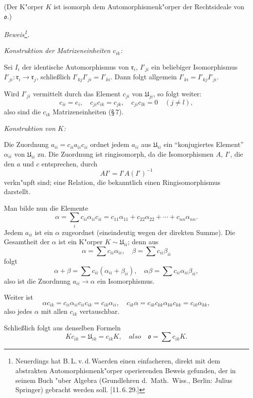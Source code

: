 \documentclass[12pt,a4paper]{article}
\theoremstyle{plain}
\begin{document}
(Der K"orper $K$ ist isomorph dem Automorphismenk"orper der Rechtsideale von $\mathfrak{o}$.)

\noindent\textit{Beweis\footnote{Neuerdings hat B.\,L.\,v.\,d.\,Waerden einen einfacheren, direkt mit dem abstrakten Automorphismenk"orper operierenden Beweis gefunden, der in seinem Buch "uber Algebra (Grundlehren d.\ Math.\ Wiss., Berlin: Julius Springer) gebracht werden soll. [11.\,6.\,29.]}.}

\textit{Konstruktion der Matrizeneinheiten $c_{ik}$:}

Sei $I_i$ der identische Automorphismus von $\mathfrak{r}_i$, $I'_{ji}$ ein beliebiger Isomorphismus $I'_{ji}:\mathfrak{r}_i \to \mathfrak{r}_j$, schlie\ss lich $I'_{kj}I'_{ji} = I'_{ki}$. Dann folgt allgemein $I'_{ki} = I'_{kj}I'_{ji}$.

Wird $I'_{ji}$ vermittelt durch das Element $c_{ji}$ von $\mathfrak{U}_{ji}$, so folgt weiter:
\[
c_{ii} = e_i,\quad c_{ji}c_{ik} = c_{jk},\quad c_{ji}c_{lk} = 0\quad (j \neq l),
\]
also sind die $c_{ik}$ Matrizeneinheiten (\S\,7).

\medskip
\textit{Konstruktion von $K$:}

Die Zuordnung $a_{ii} = c_{ii}a_{ii}c_{ii}$ ordnet jedem $a_{ii}$ aus $\mathfrak{U}_{ii}$ ein ``konjugiertes Element'' $\alpha_{ii}$ von $\mathfrak{U}_{ii}$ zu.
Die Zuordnung ist ringisomorph, da die Isomorphismen $A$, $I'$, die den $a$ und $c$ entsprechen, durch
\[
AI' = I'A(I')^{-1}
\]
verkn"upft sind; eine Relation, die bekanntlich einen Ringisomorphismus darstellt.

Man bilde nun die Elemente
\[
\alpha = \sum_i c_{ii}\alpha_{ii}c_{ii}
= c_{11}\alpha_{11} + c_{22}\alpha_{22} + \cdots + c_{nn}\alpha_{nn}.
\]
Jedem $a_{ii}$ ist ein $\alpha$ zugeordnet (eineindeutig wegen der direkten Summe). Die Gesamtheit der $\alpha$ ist ein K"orper $K \sim \mathfrak{U}_{ii}$; denn aus
\[
\alpha = \sum c_{ii}\alpha_{ii},\quad
\beta = \sum c_{ii}\beta_{ii}
\]
folgt
\[
\alpha + \beta = \sum c_{ii}(\alpha_{ii} + \beta_{ii}),\quad
\alpha\beta = \sum c_{ii}\alpha_{ii}\beta_{ii},
\]
also ist die Zuordnung $a_{ii} \to \alpha$ ein Isomorphismus.

Weiter ist
\[
\alpha c_{ik} = c_{ii}\alpha_{ii}c_{ii}c_{ik} = c_{ik}\alpha_{ii},
\quad
c_{ik}\alpha = c_{ik}c_{kk}\alpha_{kk}c_{kk} = c_{ik}\alpha_{kk},
\]
also jedes $\alpha$ mit allen $c_{ik}$ vertauschbar.

Schlie\ss lich folgt aus denselben Formeln
\[
K c_{ik} = \mathfrak{U}_{ik} = c_{ik}K,
\quad{also}\quad
\mathfrak{o} = \sum c_{ik}K.
\]
\end{document}
